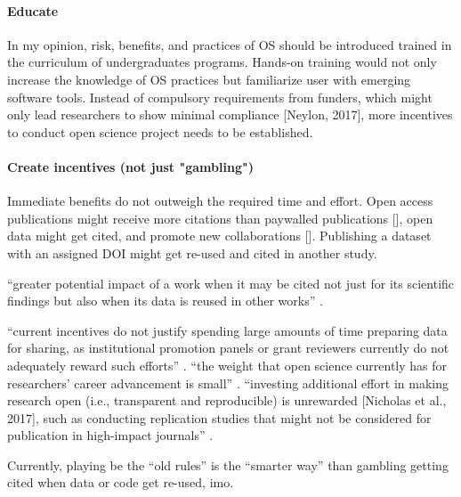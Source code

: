 \paragraph{Educate}


In my opinion, risk, benefits, and practices of OS should be introduced trained
in the curriculum of undergraduates programs.
%
Hands-on training would not only increase the knowledge of OS practices but
familiarize user with emerging software tools.
%
Instead of compulsory requirements from funders, which might only lead
researchers to show minimal compliance [Neylon, 2017], more incentives to
conduct open science project needs to be established.



\paragraph{Create incentives (not just "gambling")}
%
Immediate benefits do not outweigh the required time and effort.
%
Open access publications might receive more citations than paywalled
publications [\citep{piwowar2018state}], open data might get cited, and promote
new collaborations [\citep{popkin2019data}].
%
Publishing a dataset with an assigned DOI might get re-used and cited in another
study.

``greater potential impact of a work when it may be cited not just for its
scientific findings but also when its data is reused in other works''
\citep{nichols2017best}.

``current incentives do not justify spending large amounts of time preparing
data for sharing, as institutional promotion panels or grant reviewers currently
do not adequately reward such efforts'' \citep{nichols2017best}.
%
``the weight that open science currently has for researchers' career advancement
is small'' \citep{toribio2021early}.
%
``investing additional effort in making research open (i.e., transparent and
reproducible) is unrewarded [Nicholas et al., 2017], such as conducting
replication studies that might not be considered for publication in high-impact
journals'' \citep{toribio2021early}.

%
Currently, playing be the ``old rules'' is the ``smarter way'' than gambling
getting cited when data or code get re-used, imo.

